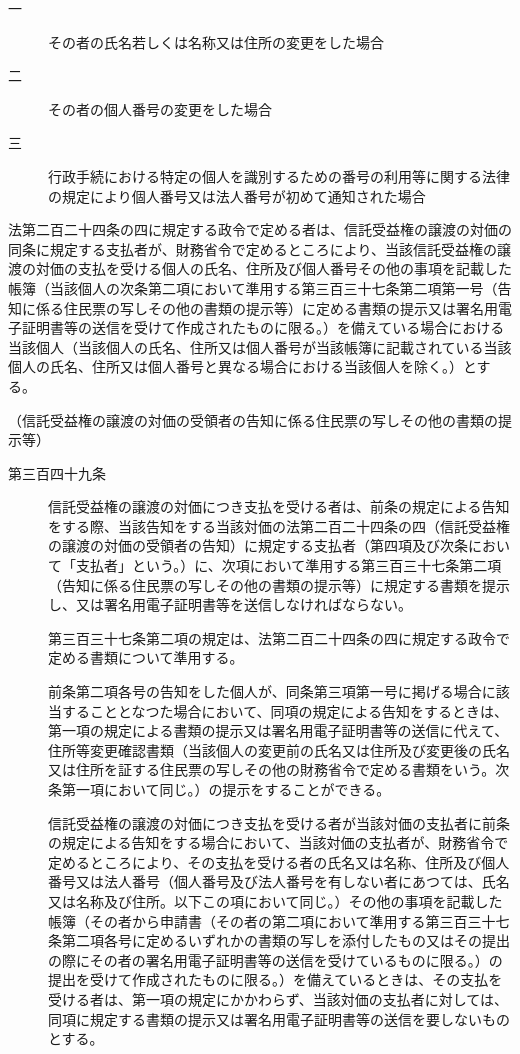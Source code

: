\documentclass[twocolumn,a4j,10pt]{ltjtarticle}
\begin{document}
\begin{description}
\begin{description}
\item[一]その者の氏名若しくは名称又は住所の変更をした場合
\item[二]その者の個人番号の変更をした場合
\item[三]行政手続における特定の個人を識別するための番号の利用等に関する法律の規定により個人番号又は法人番号が初めて通知された場合
\end{description}
\item[\rensuji{4}]法第二百二十四条の四に規定する政令で定める者は、信託受益権の譲渡の対価の同条に規定する支払者が、財務省令で定めるところにより、当該信託受益権の譲渡の対価の支払を受ける個人の氏名、住所及び個人番号その他の事項を記載した帳簿（当該個人の次条第二項において準用する第三百三十七条第二項第一号（告知に係る住民票の写しその他の書類の提示等）に定める書類の提示又は署名用電子証明書等の送信を受けて作成されたものに限る。）を備えている場合における当該個人（当該個人の氏名、住所又は個人番号が当該帳簿に記載されている当該個人の氏名、住所又は個人番号と異なる場合における当該個人を除く。）とする。
\end{description}
\noindent\hspace{10pt}（信託受益権の譲渡の対価の受領者の告知に係る住民票の写しその他の書類の提示等）
\begin{description}
\item[第三百四十九条]信託受益権の譲渡の対価につき支払を受ける者は、前条の規定による告知をする際、当該告知をする当該対価の法第二百二十四条の四（信託受益権の譲渡の対価の受領者の告知）に規定する支払者（第四項及び次条において「支払者」という。）に、次項において準用する第三百三十七条第二項（告知に係る住民票の写しその他の書類の提示等）に規定する書類を提示し、又は署名用電子証明書等を送信しなければならない。
\item[]第三百三十七条第二項の規定は、法第二百二十四条の四に規定する政令で定める書類について準用する。
\item[]前条第二項各号の告知をした個人が、同条第三項第一号に掲げる場合に該当することとなつた場合において、同項の規定による告知をするときは、第一項の規定による書類の提示又は署名用電子証明書等の送信に代えて、住所等変更確認書類（当該個人の変更前の氏名又は住所及び変更後の氏名又は住所を証する住民票の写しその他の財務省令で定める書類をいう。次条第一項において同じ。）の提示をすることができる。
\item[]信託受益権の譲渡の対価につき支払を受ける者が当該対価の支払者に前条の規定による告知をする場合において、当該対価の支払者が、財務省令で定めるところにより、その支払を受ける者の氏名又は名称、住所及び個人番号又は法人番号（個人番号及び法人番号を有しない者にあつては、氏名又は名称及び住所。以下この項において同じ。）その他の事項を記載した帳簿（その者から申請書（その者の第二項において準用する第三百三十七条第二項各号に定めるいずれかの書類の写しを添付したもの又はその提出の際にその者の署名用電子証明書等の送信を受けているものに限る。）の提出を受けて作成されたものに限る。）を備えているときは、その支払を受ける者は、第一項の規定にかかわらず、当該対価の支払者に対しては、同項に規定する書類の提示又は署名用電子証明書等の送信を要しないものとする。
\end{description}
\end{document}

